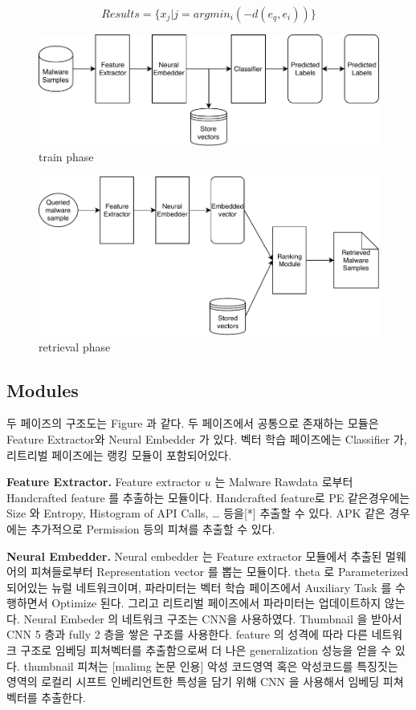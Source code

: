 \[
Results = \{x_j | j = argmin_i( {-d(e_q, e_i)} )  \}
\]


\begin{figure}[!htb] %
  \includegraphics[width=\linewidth]{../../figures/train_phase.pdf}
  \caption{train phase}
  \label{fig:train_phase}
\end{figure}

\begin{figure}[!htb] %
  \includegraphics[width=\linewidth]{../../figures/retrieval_phase.pdf}
  \caption{retrieval phase}
  \label{fig:retrieval_phase}
\end{figure}


\subsection{Modules}
두 페이즈의 구조도는 Figure 과 같다. 두 페이즈에서 공통으로 존재하는 모듈은 Feature Extractor와 Neural Embedder 가 있다. 벡터 학습 페이즈에는 Classifier 가, 리트리벌 페이즈에는 랭킹 모듈이 포함되어있다. 


\textbf{Feature Extractor. }
Feature extractor $u$ 는 Malware Rawdata 로부터 Handcrafted feature 를 추출하는 모듈이다. Handcrafted feature로 PE 같은경우에는 Size 와 Entropy, Histogram of API Calls, … 등을[*] 추출할 수 있다. APK 같은 경우에는 추가적으로 Permission 등의 피쳐를 추출할 수 있다.  

\textbf{Neural Embedder. }
Neural embedder 는 Feature extractor 모듈에서 추출된 멀웨어의 피쳐들로부터 Representation vector 를 뽑는 모듈이다. theta 로 Parameterized 되어있는 뉴럴 네트워크이며, 파라미터는 벡터 학습 페이즈에서 Auxiliary Task 를 수행하면서 Optimize 된다. 그리고 리트리벌 페이즈에서 파라미터는 업데이트하지 않는다. 
Neural Embeder 의 네트워크 구조는 CNN을 사용하였다. Thumbnail 을 받아서 CNN 5 층과 fully 2 층을 쌓은 구조를 사용한다. feature 의 성격에 따라 다른 네트워크 구조로 임베딩 피쳐벡터를 추출함으로써 더 나은 generalization 성능을 얻을 수 있다. thumbnail 피쳐는 [malimg 논문 인용] 악성 코드영역 혹은 악성코드를 특징짓는 영역의 로컬리 시프트 인베리언트한 특성을 담기 위해 CNN 을 사용해서 임베딩 피쳐벡터를 추출한다. 

